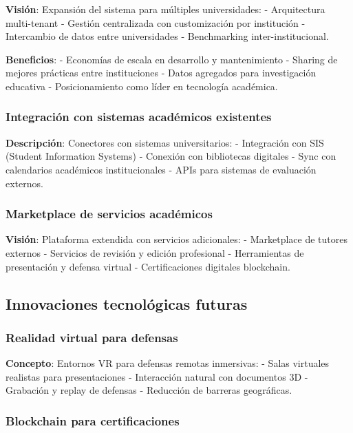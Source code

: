 \documentclass[12pt,a4paper,oneside]{report}
\begin{document}
\textbf{Visión}: Expansión del sistema para múltiples universidades: -
Arquitectura multi-tenant - Gestión centralizada con customización por
institución - Intercambio de datos entre universidades - Benchmarking
inter-institucional.

\textbf{Beneficios}: - Economías de escala en desarrollo y mantenimiento
- Sharing de mejores prácticas entre instituciones - Datos agregados
para investigación educativa - Posicionamiento como líder en tecnología
académica.

\subsubsection{Integración con sistemas académicos
existentes}\label{integraciuxf3n-con-sistemas-acaduxe9micos-existentes}

\textbf{Descripción}: Conectores con sistemas universitarios: -
Integración con SIS (Student Information Systems) - Conexión con
bibliotecas digitales - Sync con calendarios académicos institucionales
- APIs para sistemas de evaluación externos.

\subsubsection{Marketplace de servicios
académicos}\label{marketplace-de-servicios-acaduxe9micos}

\textbf{Visión}: Plataforma extendida con servicios adicionales: -
Marketplace de tutores externos - Servicios de revisión y edición
profesional - Herramientas de presentación y defensa virtual -
Certificaciones digitales blockchain.

\subsection{Innovaciones tecnológicas
futuras}\label{innovaciones-tecnoluxf3gicas-futuras}

\subsubsection{Realidad virtual para
defensas}\label{realidad-virtual-para-defensas}

\textbf{Concepto}: Entornos VR para defensas remotas inmersivas: - Salas
virtuales realistas para presentaciones - Interacción natural con
documentos 3D - Grabación y replay de defensas - Reducción de barreras
geográficas.

\subsubsection{Blockchain para
certificaciones}\label{blockchain-para-certificaciones}
\end{document}
